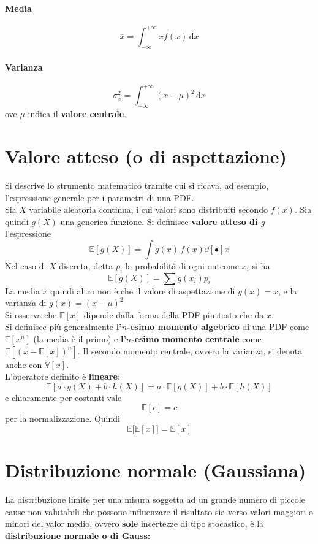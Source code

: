 \documentclass[10pt, oneside]{book}
\newcommand{\lawbox}[2]{\begin{center}
\framebox{
\parbox{\linewidth}{
\vspace{0.3cm}
\textbf{#1} \hfill $\displaystyle #2$
\vspace{0.3cm}
}
}
\end{center}}
\begin{document}
\paragraph{Media}
\[\overline{x} = \int_{-\infty}^{+\infty} x f(x) \, \mathrm{d}x\]
\paragraph{Varianza}
\[\sigma_x^2 = \int_{-\infty}^{+\infty} (x - \mu)^2 \, \mathrm{d}x\]
ove $\mu$ indica il \textbf{valore centrale}.

\section{Valore atteso (o di aspettazione)}
Si descrive lo strumento matematico tramite cui si ricava, ad esempio, l'espressione generale per i parametri di una PDF.\\
Sia $X$ variabile aleatoria continua, i cui valori sono distribuiti secondo $f(x)$. Sia quindi $g(X)$ una generica funzione. Si definisce \textbf{valore atteso di $g$} l'espressione
\[\mathbb{E}[g(X)] = \int g(x) \, f(x) \dd[•]{x}\]
Nel caso di $X$ discreta, detta $p_i$ la probabilità di ogni outcome $x_i$ si ha
\[\mathbb{E}[g(X)] = \sum g(x_i) p_i\]
La media $\overline{x}$ quindi altro non è che il valore di aspettazione di $g(x) = x$, e la varianza di $g(x) = (x-	\mu)^2$\\
Si osserva che $\mathbb{E}[x]$ dipende dalla forma della PDF piuttosto che da $x$.\\
Si definisce più generalmente \textbf{l'$n$-esimo momento algebrico} di una PDF come $\mathbb{E}[x^n]$ (la media è il primo) e \textbf{l'$n$-esimo momento centrale} come $\mathbb{E}[(x - \mathbb{E}[x])^n]$. Il secondo momento centrale, ovvero la varianza, si denota anche con $\mathbb{V}[x]$.\\
L'operatore definito è \textbf{lineare}:
\[\mathbb{E}[a \cdot g(X) + b \cdot h(X)] = a \cdot \mathbb{E}[g(X)] + b \cdot \mathbb{E}[h(X)]\]
e chiaramente per costanti vale
\[\mathbb{E}[c] = c\]
per la normalizzazione. Quindi
\[\mathbb{E}\big[\mathbb{E}[x]\big] = \mathbb{E}[x]\]

\section{Distribuzione normale (Gaussiana)}
La distribuzione limite per una misura soggetta ad un grande numero di piccole cause non valutabili che possono influenzare il risultato sia verso valori maggiori o minori del valor medio, ovvero \textbf{sole} incertezze di tipo stocastico, è la \textbf{distribuzione normale o di Gauss:}
\lawbox{Gaussiana}{G(x; \sigma, \mu) = \frac{1}{\sigma \sqrt{2\pi}} e^{\displaystyle - \frac{(x - \mu)^2}{2 \sigma^2}}}
\end{document}
